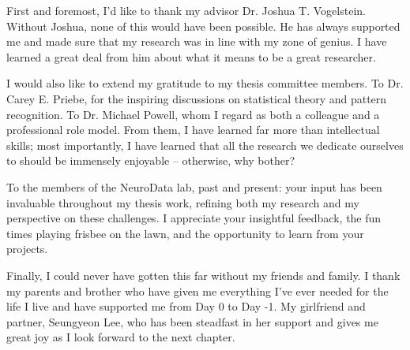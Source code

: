 First and foremost, I’d like to thank my advisor Dr. Joshua T. Vogelstein. Without Joshua, none of this would have been possible. He has always supported me and made sure that my research was in line with my zone of genius. I have learned a great deal from him about what it means to be a great researcher.

I would also like to extend my gratitude to my thesis committee members. To Dr. Carey E. Priebe, for the inspiring discussions on statistical theory and pattern recognition. To Dr. Michael Powell, whom I regard as both a colleague and a professional role model. From them, I have learned far more than intellectual skills; most importantly, I have learned that all the research we dedicate ourselves to should be immensely enjoyable -- otherwise, why bother? 

To the members of the NeuroData lab, past and present: your input has been invaluable throughout my thesis work, refining both my research and my perspective on these challenges. I appreciate your insightful feedback, the fun times playing frisbee on the lawn, and the opportunity to learn from your projects. 

Finally, I could never have gotten this far without my friends and family. I thank my parents and brother who have given me everything I’ve ever needed for the life I live and have supported me from Day 0 to Day -1. My girlfriend and partner, Seungyeon Lee, who has been steadfast in her support and gives me great joy as I look forward to the next chapter. 